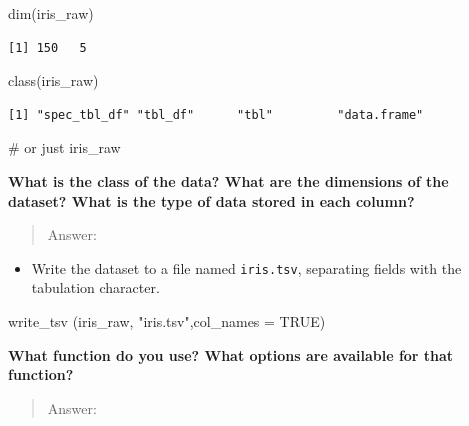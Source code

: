 \documentclass[
  letterpaper,
  DIV=11,
  numbers=noendperiod]{scrartcl}
\newenvironment{Shaded}{\begin{snugshade}}{\end{snugshade}}
\newcommand{\AttributeTok}[1]{\textcolor[rgb]{0.40,0.45,0.13}{#1}}
\newcommand{\CommentTok}[1]{\textcolor[rgb]{0.37,0.37,0.37}{#1}}
\newcommand{\ConstantTok}[1]{\textcolor[rgb]{0.56,0.35,0.01}{#1}}
\newcommand{\FunctionTok}[1]{\textcolor[rgb]{0.28,0.35,0.67}{#1}}
\newcommand{\NormalTok}[1]{\textcolor[rgb]{0.00,0.23,0.31}{#1}}
\newcommand{\StringTok}[1]{\textcolor[rgb]{0.13,0.47,0.30}{#1}}
\providecommand{\tightlist}{%
  \setlength{\itemsep}{0pt}\setlength{\parskip}{0pt}}\usepackage{longtable,booktabs,array}
\begin{document}
\begin{Shaded}
\begin{Highlighting}[]
\FunctionTok{dim}\NormalTok{(iris\_raw)}
\end{Highlighting}
\end{Shaded}

\begin{verbatim}
[1] 150   5
\end{verbatim}

\begin{Shaded}
\begin{Highlighting}[]
\FunctionTok{class}\NormalTok{(iris\_raw)}
\end{Highlighting}
\end{Shaded}

\begin{verbatim}
[1] "spec_tbl_df" "tbl_df"      "tbl"         "data.frame" 
\end{verbatim}

\begin{Shaded}
\begin{Highlighting}[]
\CommentTok{\# or just iris\_raw}
\end{Highlighting}
\end{Shaded}

\textbf{What is the class of the data? What are the dimensions of the
dataset? What is the type of data stored in each column?}

\begin{quote}
Answer:
\end{quote}

\begin{itemize}
\tightlist
\item
  Write the dataset to a file named \texttt{iris.tsv}, separating fields
  with the tabulation character.
\end{itemize}

\begin{Shaded}
\begin{Highlighting}[]
\FunctionTok{write\_tsv}\NormalTok{ (iris\_raw, }\StringTok{"iris.tsv"}\NormalTok{,}\AttributeTok{col\_names =} \ConstantTok{TRUE}\NormalTok{)}
\end{Highlighting}
\end{Shaded}

\textbf{What function do you use? What options are available for that
function?}

\begin{quote}
Answer:
\end{quote}
\end{document}
